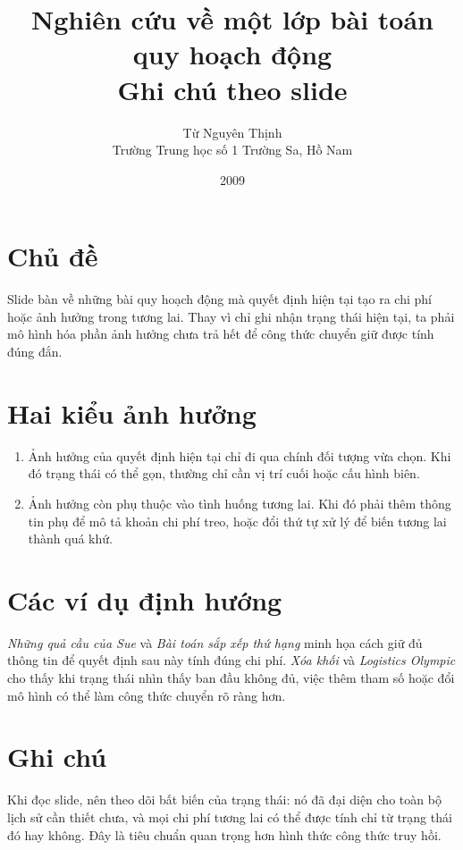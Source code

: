 \documentclass[11pt]{article}
\title{Nghiên cứu về một lớp bài toán quy hoạch động\\{\large Ghi chú theo slide}}
\author{Từ Nguyên Thịnh\\Trường Trung học số 1 Trường Sa, Hồ Nam}
\date{2009}
\begin{document}
\maketitle


\section{Chủ đề}

Slide bàn về những bài quy hoạch động mà quyết định hiện tại tạo ra chi phí
hoặc ảnh hưởng trong tương lai. Thay vì chỉ ghi nhận trạng thái hiện tại, ta
phải mô hình hóa phần ảnh hưởng chưa trả hết để công thức chuyển giữ được tính
đúng đắn.

\section{Hai kiểu ảnh hưởng}

\begin{enumerate}
  \item Ảnh hưởng của quyết định hiện tại chỉ đi qua chính đối tượng vừa chọn.
  Khi đó trạng thái có thể gọn, thường chỉ cần vị trí cuối hoặc cấu hình biên.
  \item Ảnh hưởng còn phụ thuộc vào tình huống tương lai. Khi đó phải thêm
  thông tin phụ để mô tả khoản chi phí treo, hoặc đổi thứ tự xử lý để biến
  tương lai thành quá khứ.
\end{enumerate}

\section{Các ví dụ định hướng}

\textit{Những quả cầu của Sue} và \textit{Bài toán sắp xếp thứ hạng} minh họa
cách giữ đủ thông tin để quyết định sau này tính đúng chi phí. \textit{Xóa
khối} và \textit{Logistics Olympic} cho thấy khi trạng thái nhìn thấy ban đầu
không đủ, việc thêm tham số hoặc đổi mô hình có thể làm công thức chuyển rõ
ràng hơn.

\section{Ghi chú}

Khi đọc slide, nên theo dõi bất biến của trạng thái: nó đã đại diện cho toàn
bộ lịch sử cần thiết chưa, và mọi chi phí tương lai có thể được tính chỉ từ
trạng thái đó hay không. Đây là tiêu chuẩn quan trọng hơn hình thức công thức
truy hồi.
\end{document}

